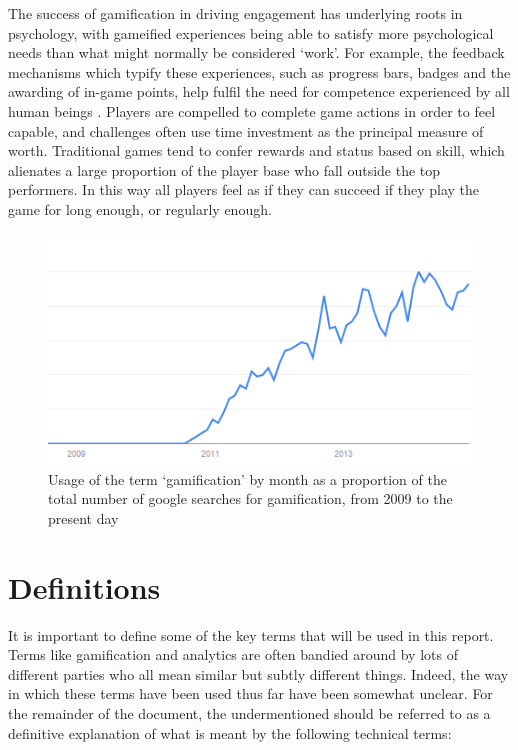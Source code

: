 \documentclass{article}
\begin{document}
The success of gamification in driving engagement has underlying roots in psychology, with gameified experiences being able to satisfy more psychological needs than what might normally be considered `work'. For example, the feedback mechanisms which typify these experiences, such as progress bars, badges and the awarding of in-game points, help fulfil the need for competence experienced by all human beings \cite{przybylski2010motivational}. Players are compelled to complete game actions in order to feel capable, and challenges often use time investment as the principal measure of worth. Traditional games tend to confer rewards and status based on skill, which alienates a large proportion of the player base who fall outside the top performers. In this way all players feel as if they can succeed if they play the game for long enough, or regularly enough.

\begin{figure}
	\includegraphics{../img/usage-graph.png}
	\caption{Usage of the term `gamification' by month as a proportion of the total number of google searches for gamification, from 2009 to the present day \cite{usage}}
	\label{usagegraph}
\end{figure}

\section{Definitions}
It is important to define some of the key terms that will be used in this report. Terms like gamification and analytics are often bandied around by lots of different parties who all mean similar but subtly different things. Indeed, the way in which these terms have been used thus far have been somewhat unclear. For the remainder of the document, the undermentioned should be referred to as a definitive explanation of what is meant by the following technical terms:
\end{document}
